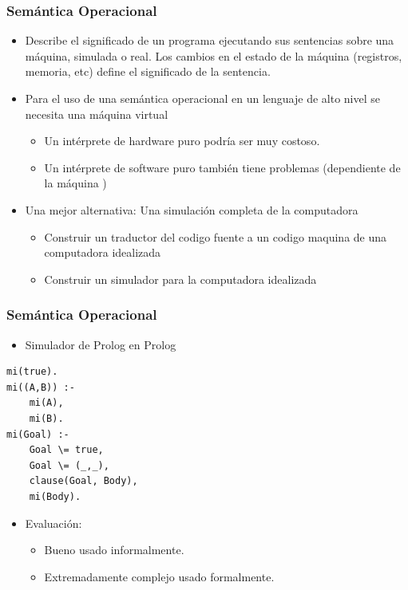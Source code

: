 \documentclass[11pt]{article}
\begin{document}
\subsubsection*{Semántica Operacional}
\label{sec:org8bb72d4}
\begin{itemize}
\item Describe el significado de un programa ejecutando sus sentencias
sobre una máquina, simulada o real. Los cambios en el estado de la
máquina (registros, memoria, etc) define el significado de la sentencia.
\item Para el uso de una semántica operacional en un lenguaje de alto
nivel se necesita una máquina virtual
\begin{itemize}
\item Un intérprete de hardware puro podría ser muy costoso.
\item Un intérprete de software puro también tiene problemas
(dependiente de la máquina )
\end{itemize}
\item Una mejor alternativa: Una simulación completa de la computadora
\begin{itemize}
\item Construir un traductor del codigo fuente a un codigo maquina de
una computadora idealizada
\item Construir un simulador para la computadora idealizada
\end{itemize}
\end{itemize}

\subsubsection*{Semántica Operacional}
\label{sec:org534c97b}

\begin{itemize}
\item Simulador de Prolog en Prolog
\end{itemize}

\begin{verbatim}
mi(true).
mi((A,B)) :-
	mi(A),
	mi(B).
mi(Goal) :-
	Goal \= true,
	Goal \= (_,_),
	clause(Goal, Body),
	mi(Body).
\end{verbatim}

\begin{itemize}
\item Evaluación:
\begin{itemize}
\item Bueno usado informalmente.
\item Extremadamente complejo usado formalmente.
\end{itemize}
\end{itemize}
\end{document}
